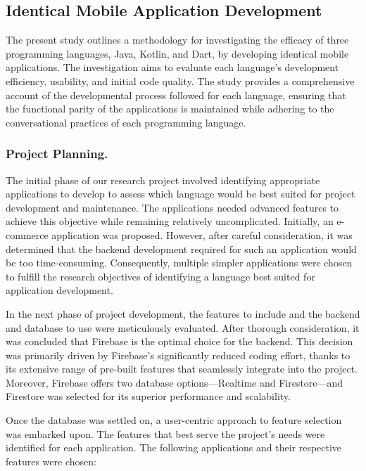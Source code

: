 \subsection{Identical Mobile Application Development}
The present study outlines a methodology for investigating the efficacy of three programming languages, Java, Kotlin, and Dart, by developing identical mobile applications. The investigation aims to evaluate each language's development efficiency, usability, and initial code quality. The study provides a comprehensive account of the developmental process followed for each language, ensuring that the functional parity of the applications is maintained while adhering to the conversational practices of each programming language.

\subsubsection{Project Planning.}
The initial phase of our research project involved identifying appropriate applications to develop to assess which language would be best suited for project development and maintenance. The applications needed advanced features to achieve this objective while remaining relatively uncomplicated. Initially, an e-commerce application was proposed. However, after careful consideration, it was determined that the backend development required for such an application would be too time-consuming. Consequently, multiple simpler applications were chosen to fulfill the research objectives of identifying a language best suited for application development.

In the next phase of project development, the features to include and the backend and database to use were meticulously evaluated. After thorough consideration, it was concluded that Firebase is the optimal choice for the backend. This decision was primarily driven by Firebase’s significantly reduced coding effort, thanks to its extensive range of pre-built features that seamlessly integrate into the project. Moreover, Firebase offers two database options—Realtime and Firestore—and Firestore was selected for its superior performance and scalability.

Once the database was settled on, a user-centric approach to feature selection was embarked upon. The features that best serve the project’s needs were identified for each application. The following applications and their respective features were chosen:

